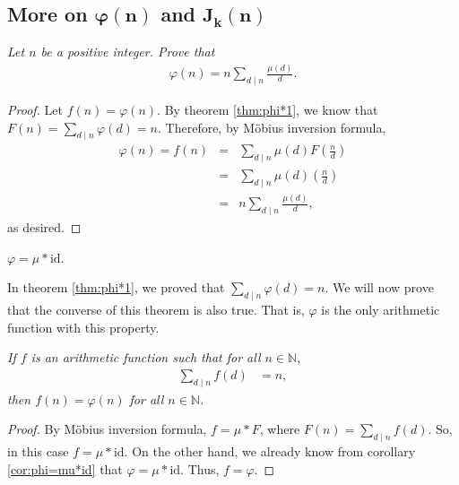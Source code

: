 \documentclass[12pt]{subfile}
\begin{document}
\subsection{More on \texorpdfstring{$\boldsymbol{\varphi(n)}$}{\textphi(n)} and \texorpdfstring{$\boldsymbol{J_k(n)}$}{Jk(n)}}\label{sec:euler-jordan}
		\begin{theorem} \slshape \label{thm:phi=n*sigma(mu/k)}
			Let $n$ be a positive integer. Prove that
			\begin{align*}
			\varphi(n)= n\sum_{d\mid n} \frac{\mu(d)}{d}.
			\end{align*}
		\end{theorem}

		\begin{proof}
			Let $f(n)=\varphi(n)$. By theorem \ref{thm:phi*1}, we know that $F(n)=\sum\limits_{d\mid n} \varphi(d)=n$. Therefore, by M\"{o}bius inversion formula,
				\begin{eqnarray*}
					\varphi(n) = f(n) &=& \sum_{d\mid n}\mu(d)F\left(\frac nd\right)\\
									  &=& \sum_{d\mid n}\mu(d)\left(\frac nd\right)\\
									  &=& n\sum_{d\mid n} \frac{\mu(d)}{d},
				\end{eqnarray*}
			as desired.
		\end{proof}


		\begin{corollary}\label{cor:phi=mu*id}
			$\varphi = \mu \ast \text{id}$.
		\end{corollary}

In theorem \ref{thm:phi*1}, we proved that $\sum\limits_{d\mid n} \varphi(d)=n$. We will now prove that the converse of this theorem is also true. That is, $\varphi$ is the only arithmetic function with this property.

		\begin{theorem}\slshape \label{thm:sumofphicon}
			If $f$ is an arithmetic function such that for all $n\in\mathbb{N} $,
				\begin{align*}
					\sum_{d\mid n}f(d) & = n,
				\end{align*}
			then $f(n)=\varphi(n)$ for all $n\in\mathbb{N} $.
		\end{theorem}

		\begin{proof}
			By M\"{o}bius inversion formula, $f = \mu \ast F$, where $F(n)=\sum\limits_{d\mid n}f(d)$. So, in this case $f=\mu \ast \text{id}$. On the other hand, we already know from corollary \ref{cor:phi=mu*id} that $\varphi=\mu \ast \text{id}$. Thus, $f=\varphi$.
		\end{proof}
\end{document}
